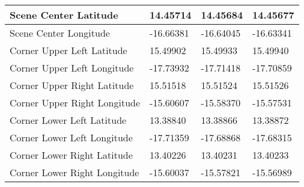 \begin{table}[!ht]
\begin{tabular}{|l|l|l|l|}
        Scene Center Latitude & 14.45714 & 14.45684 & 14.45677 \\ \hline
        Scene Center Longitude & -16.66381 & -16.64045 & -16.63341 \\ \hline
        Corner Upper Left Latitude & 15.49902 & 15.49933 & 15.49940 \\ \hline
        Corner Upper Left Longitude & -17.73932 & -17.71418 & -17.70859 \\ \hline
        Corner Upper Right Latitude & 15.51518 & 15.51524 & 15.51526 \\ \hline
        Corner Upper Right Longitude & -15.60607 & -15.58370 & -15.57531 \\ \hline
        Corner Lower Left Latitude & 13.38840 & 13.38866 & 13.38872 \\ \hline
        Corner Lower Left Longitude & -17.71359 & -17.68868 & -17.68315 \\ \hline
        Corner Lower Right Latitude & 13.40226 & 13.40231 & 13.40233 \\ \hline
        Corner Lower Right Longitude & -15.60037 & -15.57821 & -15.56989 \\ \hline
    \end{tabular}
\end{table}